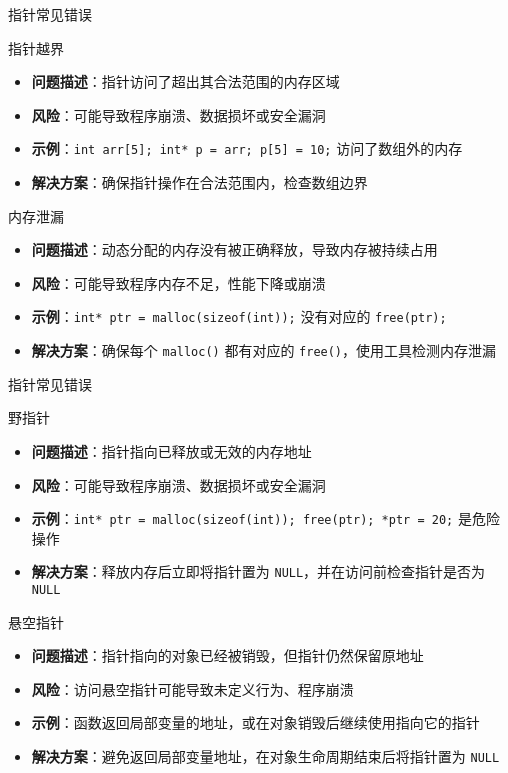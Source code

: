 \documentclass[UTF8,aspectratio=169]{beamer}
\begin{document}
\begin{frame}{指针常见错误}
    \begin{ytublock}{指针越界}
        \begin{itemize}
            \item \textbf{问题描述}：指针访问了超出其合法范围的内存区域
            \item \textbf{风险}：可能导致程序崩溃、数据损坏或安全漏洞
            \item \textbf{示例}：\texttt{int arr[5]; int* p = arr; p[5] = 10;} 访问了数组外的内存
            \item \textbf{解决方案}：确保指针操作在合法范围内，检查数组边界
        \end{itemize}
    \end{ytublock}
    \begin{ytublock}{内存泄漏}
        \begin{itemize}
            \item \textbf{问题描述}：动态分配的内存没有被正确释放，导致内存被持续占用
            \item \textbf{风险}：可能导致程序内存不足，性能下降或崩溃
            \item \textbf{示例}：\texttt{int* ptr = malloc(sizeof(int));} 没有对应的 \texttt{free(ptr);}
            \item \textbf{解决方案}：确保每个 \texttt{malloc()} 都有对应的 \texttt{free()}，使用工具检测内存泄漏
        \end{itemize}
    \end{ytublock}
\end{frame}

\begin{frame}{指针常见错误}
    \begin{ytublock}{野指针}
        \begin{itemize}
            \item \textbf{问题描述}：指针指向已释放或无效的内存地址
            \item \textbf{风险}：可能导致程序崩溃、数据损坏或安全漏洞
            \item \textbf{示例}：\texttt{int* ptr = malloc(sizeof(int)); free(ptr); *ptr = 20;} 是危险操作
            \item \textbf{解决方案}：释放内存后立即将指针置为 \texttt{NULL}，并在访问前检查指针是否为 \texttt{NULL}
        \end{itemize}
    \end{ytublock}
    \begin{ytublock}{悬空指针}
        \begin{itemize}
            \item \textbf{问题描述}：指针指向的对象已经被销毁，但指针仍然保留原地址
            \item \textbf{风险}：访问悬空指针可能导致未定义行为、程序崩溃
            \item \textbf{示例}：函数返回局部变量的地址，或在对象销毁后继续使用指向它的指针
            \item \textbf{解决方案}：避免返回局部变量地址，在对象生命周期结束后将指针置为 \texttt{NULL}
        \end{itemize}
    \end{ytublock}
\end{frame}
\end{document}
